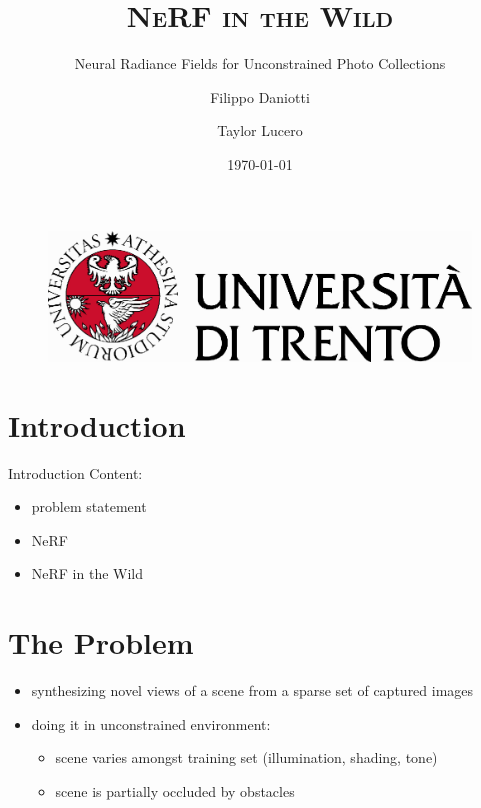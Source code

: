 \documentclass[aspectratio=1610,handout]{beamer}
\author[Daniotti \and Lucero]{Filippo Daniotti \and Taylor Lucero}
\title[NeRF-W]{\textsc{NeRF in the Wild}}
\subtitle{Neural Radiance Fields for Unconstrained Photo Collections}
\institute[DISI - UniTN]{Department of Information Engineering\\and Computer Science}
\date{\today}
\begin{document}
\begin{frame}
    \titlepage
    \begin{figure}[H]
        \begin{center}
            \includegraphics[width=0.4\linewidth]{marchio_unitrento_colore_it_202002.eps}
        \end{center}
    \end{figure}
\end{frame}


\begin{frame}
    \tableofcontents[sectionstyle=show,subsectionstyle=show/shaded/hide,subsubsectionstyle=show/shaded/hide]
\end{frame}

\section{Introduction}
\begin{frame}{Introduction}
    Content:
    \begin{itemize}
        \item problem statement
        \item NeRF
        \item NeRF in the Wild
    \end{itemize}
\end{frame}

\section{The Problem}
\begin{frame}
    \begin{itemize}
        \item synthesizing novel views of a scene from a sparse set of captured images
        \item doing it in unconstrained environment:
        \begin{itemize}
            \item scene varies amongst training set (illumination, shading, tone)
            \item scene is partially occluded by obstacles
        \end{itemize}
    \end{itemize}
\end{frame}
\end{document}
